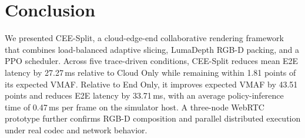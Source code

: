 \documentclass[acmsmall]{acmart}
\begin{document}
	\section{Conclusion}
	
We presented CEE-Split, a cloud-edge-end collaborative rendering framework that combines
load-balanced adaptive slicing, LumaDepth RGB-D packing, and a PPO scheduler. Across five
trace-driven conditions, CEE-Split reduces mean E2E latency by 27.27\,ms relative to Cloud Only
while remaining within 1.81 points of its expected VMAF. Relative to End Only, it improves expected
VMAF by 43.51 points and reduces E2E latency by 33.71\,ms, with an average policy-inference time of
0.47\,ms per frame on the simulator host. A three-node WebRTC prototype further confirms RGB-D composition and parallel
distributed execution under real codec and network behavior.
	
	
	
	
\end{document}
